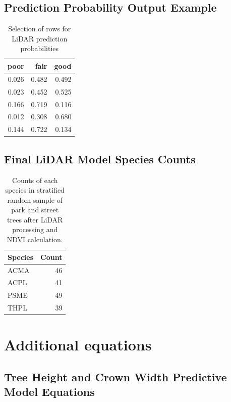 \documentclass[12pt,twoside]{reedthesis}
\begin{document}
\hypertarget{prediction-probability-output-example}{%
\subsection*{Prediction Probability Output Example}\label{prediction-probability-output-example}}
\begin{table}[H]

\caption{\label{tab:preds-head}Selection of rows for LiDAR prediction probabilities}
\centering
\begin{tabular}[t]{rrr}
\toprule
poor & fair & good\\
\midrule
0.026 & 0.482 & 0.492\\
0.023 & 0.452 & 0.525\\
0.166 & 0.719 & 0.116\\
0.012 & 0.308 & 0.680\\
0.144 & 0.722 & 0.134\\
\bottomrule
\end{tabular}
\end{table}
\hypertarget{final-lidar-model-species-counts}{%
\subsection*{Final LiDAR Model Species Counts}\label{final-lidar-model-species-counts}}
\begin{longtable}[t]{lr}
\caption[Species counts post LiDAR processing]{\label{tab:final-lidar-counts}Counts of each species in stratified random sample of park and street trees after LiDAR processing and NDVI calculation.}\\
\toprule
Species & Count\\
\midrule
ACMA & 46\\
ACPL & 41\\
PSME & 49\\
THPL & 39\\
\bottomrule
\end{longtable}
\hypertarget{additional-equations}{%
\section{Additional equations}\label{additional-equations}}

\hypertarget{tree-height-and-crown-width-predictive-model-equations}{%
\subsection*{Tree Height and Crown Width Predictive Model Equations}\label{tree-height-and-crown-width-predictive-model-equations}}
\end{document}
